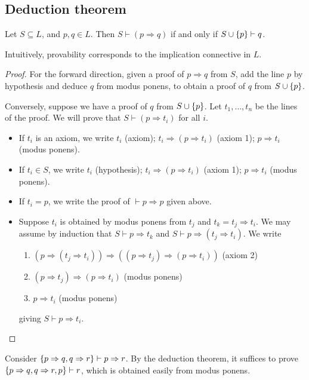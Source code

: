 \subsection{Deduction theorem}
\begin{theorem}
    Let \( S \subseteq L \), and \( p, q \in L \).
    Then \( S \vdash (p \Rightarrow q) \) if and only if \( S \cup \qty{p} \vdash q \).
\end{theorem}
Intuitively, provability corresponds to the implication connective in \( L \).
\begin{proof}
    For the forward direction, given a proof of \( p \Rightarrow q \) from \( S \), add the line \( p \) by hypothesis and deduce \( q \) from modus ponens, to obtain a proof of \( q \) from \( S \cup \qty{p} \).

    Conversely, suppose we have a proof of \( q \) from \( S \cup \qty{p} \).
    Let \( t_1, \dots, t_n \) be the lines of the proof.
    We will prove that \( S \vdash (p \Rightarrow t_i) \) for all \( i \).
    \begin{itemize}
        \item If \( t_i \) is an axiom, we write \( t_i \) (axiom); \( t_i \Rightarrow (p \Rightarrow t_i) \) (axiom 1); \( p \Rightarrow t_i \) (modus ponens).
        \item If \( t_i \in S \), we write \( t_i \) (hypothesis); \( t_i \Rightarrow (p \Rightarrow t_i) \) (axiom 1); \( p \Rightarrow t_i \) (modus ponens).
        \item If \( t_i = p \), we write the proof of \( \vdash p \Rightarrow p \) given above.
        \item Suppose \( t_i \) is obtained by modus ponens from \( t_j \) and \( t_k = t_j \Rightarrow t_i \).
        We may assume by induction that \( S \vdash p \Rightarrow t_k \) and \( S \vdash p \Rightarrow (t_j \Rightarrow t_i) \).
        We write
        \begin{enumerate}[1.]
            \item \( (p \Rightarrow (t_j \Rightarrow t_i)) \Rightarrow ((p \Rightarrow t_j) \Rightarrow (p \Rightarrow t_i)) \) (axiom 2)
            \item \( (p \Rightarrow t_j) \Rightarrow (p \Rightarrow t_i) \) (modus ponens)
            \item \( p \Rightarrow t_i \) (modus ponens)
        \end{enumerate}
        giving \( S \vdash p \Rightarrow t_i \).
    \end{itemize}
\end{proof}
\begin{example}
    Consider \( \qty{p \Rightarrow q, q \Rightarrow r} \vdash p \Rightarrow r \).
    By the deduction theorem, it suffices to prove \( \qty{p \Rightarrow q, q \Rightarrow r, p} \vdash r \), which is obtained easily from modus ponens.
\end{example}


